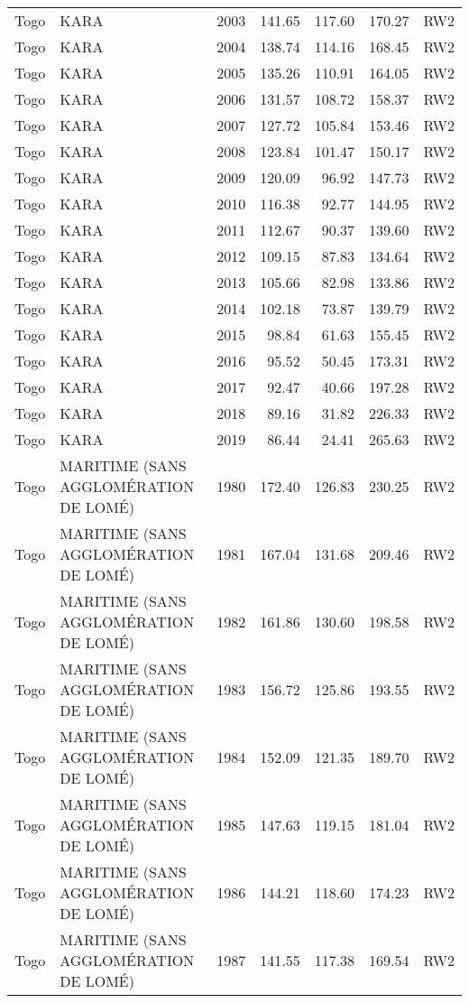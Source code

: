\begin{longtable}{lllrrrl}
  Togo & KARA & 2003 & 141.65 & 117.60 & 170.27 & RW2 \\ 
  Togo & KARA & 2004 & 138.74 & 114.16 & 168.45 & RW2 \\ 
  Togo & KARA & 2005 & 135.26 & 110.91 & 164.05 & RW2 \\ 
  Togo & KARA & 2006 & 131.57 & 108.72 & 158.37 & RW2 \\ 
  Togo & KARA & 2007 & 127.72 & 105.84 & 153.46 & RW2 \\ 
  Togo & KARA & 2008 & 123.84 & 101.47 & 150.17 & RW2 \\ 
  Togo & KARA & 2009 & 120.09 & 96.92 & 147.73 & RW2 \\ 
  Togo & KARA & 2010 & 116.38 & 92.77 & 144.95 & RW2 \\ 
  Togo & KARA & 2011 & 112.67 & 90.37 & 139.60 & RW2 \\ 
  Togo & KARA & 2012 & 109.15 & 87.83 & 134.64 & RW2 \\ 
  Togo & KARA & 2013 & 105.66 & 82.98 & 133.86 & RW2 \\ 
  Togo & KARA & 2014 & 102.18 & 73.87 & 139.79 & RW2 \\ 
  Togo & KARA & 2015 & 98.84 & 61.63 & 155.45 & RW2 \\ 
  Togo & KARA & 2016 & 95.52 & 50.45 & 173.31 & RW2 \\ 
  Togo & KARA & 2017 & 92.47 & 40.66 & 197.28 & RW2 \\ 
  Togo & KARA & 2018 & 89.16 & 31.82 & 226.33 & RW2 \\ 
  Togo & KARA & 2019 & 86.44 & 24.41 & 265.63 & RW2 \\ 
  Togo & MARITIME (SANS AGGLOMÉRATION DE LOMÉ) & 1980 & 172.40 & 126.83 & 230.25 & RW2 \\ 
  Togo & MARITIME (SANS AGGLOMÉRATION DE LOMÉ) & 1981 & 167.04 & 131.68 & 209.46 & RW2 \\ 
  Togo & MARITIME (SANS AGGLOMÉRATION DE LOMÉ) & 1982 & 161.86 & 130.60 & 198.58 & RW2 \\ 
  Togo & MARITIME (SANS AGGLOMÉRATION DE LOMÉ) & 1983 & 156.72 & 125.86 & 193.55 & RW2 \\ 
  Togo & MARITIME (SANS AGGLOMÉRATION DE LOMÉ) & 1984 & 152.09 & 121.35 & 189.70 & RW2 \\ 
  Togo & MARITIME (SANS AGGLOMÉRATION DE LOMÉ) & 1985 & 147.63 & 119.15 & 181.04 & RW2 \\ 
  Togo & MARITIME (SANS AGGLOMÉRATION DE LOMÉ) & 1986 & 144.21 & 118.60 & 174.23 & RW2 \\ 
  Togo & MARITIME (SANS AGGLOMÉRATION DE LOMÉ) & 1987 & 141.55 & 117.38 & 169.54 & RW2 \\ 

\end{longtable}

